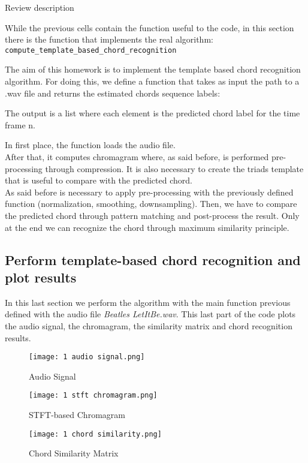 \documentclass{article}
\begin{document}
\color{red}Review description\color{black}

While the previous cells contain the function useful to the code, in this section there is the function that implements the real algorithm: \verb |compute_template_based_chord_recognition|



The aim of this homework is to implement the template based chord recognition algorithm. For doing this, we define a function that takes as input the path to a .wav file and returns the estimated chords sequence labels:

The output is a list where each element is the predicted chord label for the time frame n.

In first place, the function loads the audio file.\\ After that, it computes chromagram where, as said before, is performed pre-processing through compression. It is also necessary to create the triads template that is useful to compare with the predicted chord.\\
As said before is necessary to apply pre-processing with the previously defined function (normalization, smoothing, downsampling).
Then, we have to compare the predicted chord through pattern matching and post-process the result.
Only at the end we can recognize the chord through maximum similarity principle.\\

\subsection*{Perform template-based chord recognition and plot results}

In this last section we perform the algorithm with the main function previous defined with the audio file \emph{Beatles LetItBe.wav}. This last part of the code plots the audio signal, the chromagram, the similarity matrix and chord recognition results.

\begin{figure}[H]
 \centering
 \texttt{[image: 1 audio signal.png]}
 \caption{Audio Signal}
\end{figure}

\begin{figure}[H]
 \centering
 \texttt{[image: 1 stft chromagram.png]}
 \caption{STFT-based Chromagram}
\end{figure}

\begin{figure}[H]
 \centering
 \texttt{[image: 1 chord similarity.png]}
 \caption{Chord Similarity Matrix}
\end{figure}
\end{document}
